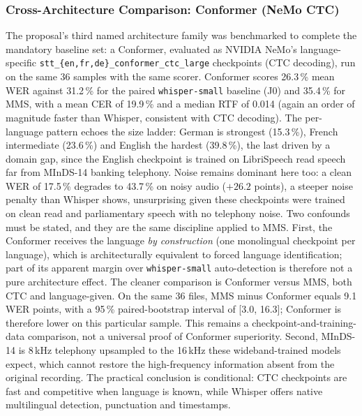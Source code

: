 \documentclass[12pt]{report}
\begin{document}
\subsubsection{Cross-Architecture Comparison: Conformer (NeMo CTC)}
The proposal's third named architecture family was benchmarked to complete the mandatory baseline set: a Conformer, evaluated as NVIDIA NeMo's language-specific \texttt{stt\_\allowbreak \{en,fr,de\}\_\allowbreak conformer\_\allowbreak ctc\_\allowbreak large} checkpoints (CTC decoding), run on the same 36 samples with the same scorer. Conformer scores 26.3\,\% mean WER against 31.2\,\% for the paired \texttt{whisper-small} baseline (J0) and 35.4\,\% for MMS, with a mean CER of 19.9\,\% and a median RTF of 0.014 (again an order of magnitude faster than Whisper, consistent with CTC decoding). The per-language pattern echoes the size ladder: German is strongest (15.3\,\%), French intermediate (23.6\,\%) and English the hardest (39.8\,\%), the last driven by a domain gap, since the English checkpoint is trained on LibriSpeech read speech far from MInDS-14 banking telephony. Noise remains dominant here too: a clean WER of 17.5\,\% degrades to 43.7\,\% on noisy audio ($+26.2$ points), a steeper noise penalty than Whisper shows, unsurprising given these checkpoints were trained on clean read and parliamentary speech with no telephony noise.
Two confounds must be stated, and they are the same discipline applied to MMS. First, the Conformer receives the language \emph{by construction} (one monolingual checkpoint per language), which is architecturally equivalent to forced language identification; part of its apparent margin over \texttt{whisper-small} auto-detection is therefore not a pure architecture effect. The cleaner comparison is Conformer versus MMS, both CTC and language-given. On the same 36 files, MMS minus Conformer equals 9.1 WER points, with a 95\,\% paired-bootstrap interval of [3.0, 16.3]; Conformer is therefore lower on this particular sample. This remains a checkpoint-and-training-data comparison, not a universal proof of Conformer superiority. Second, MInDS-14 is 8\,kHz telephony upsampled to the 16\,kHz these wideband-trained models expect, which cannot restore the high-frequency information absent from the original recording. The practical conclusion is conditional: CTC checkpoints are fast and competitive when language is known, while Whisper offers native multilingual detection, punctuation and timestamps.
\end{document}
